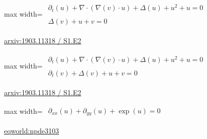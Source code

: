 \documentclass[10pt,a4paper]{article}
\begin{document}
\begin{minipage}{\linewidth}
\begin{center}\begin{adjustbox}{max width=\linewidth}$\displaystyle\begin{gathered}\begin{gathered}\partial_{t}(u)+\nabla\cdot(\nabla(v)\cdot u)+\Delta(u)+u^{2}+u=0\end{gathered}\\[5pt]\begin{gathered}\Delta(v)+u+v=0\end{gathered}\end{gathered}$\end{adjustbox}\end{center}
{\small \href{https://arxiv.org/html/1903.11318#S1.E2}{arxiv:1903.11318 / S1.E2}}\par
\end{minipage}\par\vspace{7mm}

\begin{minipage}{\linewidth}
\begin{center}\begin{adjustbox}{max width=\linewidth}$\displaystyle\begin{gathered}\begin{gathered}\partial_{t}(u)+\nabla\cdot(\nabla(v)\cdot u)+\Delta(u)+u^{2}+u=0\end{gathered}\\[5pt]\begin{gathered}\partial_{t}(v)+\Delta(v)+u+v=0\end{gathered}\end{gathered}$\end{adjustbox}\end{center}
{\small \href{https://arxiv.org/html/1903.11318#S1.E2}{arxiv:1903.11318 / S1.E2}}\par
\end{minipage}\par\vspace{7mm}

\begin{minipage}{\linewidth}
\begin{center}\begin{adjustbox}{max width=\linewidth}$\displaystyle\begin{gathered}\begin{gathered}\partial_{xx}(u)+\partial_{yy}(u)+\exp(u)=0\end{gathered}\end{gathered}$\end{adjustbox}\end{center}
{\small \href{https://eqworld.ipmnet.ru/en/solutions/npde/npde3103.pdf}{eqworld:npde3103}}\par
\end{minipage}\par\vspace{7mm}
\end{document}
